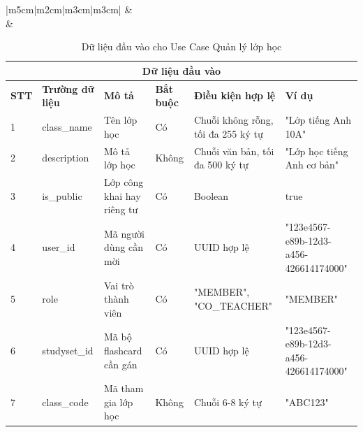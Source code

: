 \documentclass[../DoAn.tex]{subfiles}
\begin{document}
\begin{table}[h!]
\begin{tabular}{|m{5cm}|m{2cm}|m{3cm}|m{3cm}|}
    \hline
     & 
     \\
    \hline
     &  \\
    \hline
\end{tabular}
\caption{Thông tin chi tiết về Use Case Quản lý lớp học}
\end{table}

\vspace{0.5cm}

\begin{table}[h!]
\centering
\begin{tabular}{|m{1cm}|m{2.5cm}|m{3cm}|m{1cm}|m{2.5cm}|m{3.5cm}|}
    \hline
    \multicolumn{6}{|c|}{\textbf{Dữ liệu đầu vào}} \\
    \hline
    \textbf{STT} & \textbf{Trường dữ liệu} & \textbf{Mô tả} & \textbf{Bắt buộc} & \textbf{Điều kiện hợp lệ} & \textbf{Ví dụ} \\
    \hline
    1 & class\_name & Tên lớp học & Có & Chuỗi không rỗng, tối đa 255 ký tự & "Lớp tiếng Anh 10A" \\
    \hline
    2 & description & Mô tả lớp học & Không & Chuỗi văn bản, tối đa 500 ký tự & "Lớp học tiếng Anh cơ bản" \\
    \hline
    3 & is\_public & Lớp công khai hay riêng tư & Có & Boolean & true \\
    \hline
    4 & user\_id & Mã người dùng cần mời & Có & UUID hợp lệ & "123e4567-e89b-12d3-a456-426614174000" \\
    \hline
    5 & role & Vai trò thành viên & Có & "MEMBER", "CO\_TEACHER" & "MEMBER" \\
    \hline
    6 & studyset\_id & Mã bộ flashcard cần gán & Có & UUID hợp lệ & "123e4567-e89b-12d3-a456-426614174000" \\
    \hline
    7 & class\_code & Mã tham gia lớp học & Không & Chuỗi 6-8 ký tự & "ABC123" \\
    \hline
\end{tabular}
\caption{Dữ liệu đầu vào cho Use Case Quản lý lớp học}
\end{table}
\end{document}
